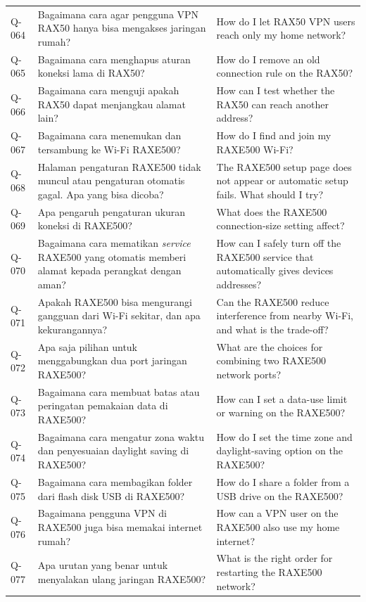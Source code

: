 \begin{longtable}{@{}>{\RaggedRight\arraybackslash}p{1.6cm}>{\RaggedRight\arraybackslash}p{5.8cm}>{\RaggedRight\arraybackslash}p{\dimexpr\textwidth-1.6cm-5.8cm-4\tabcolsep\relax}@{}}
Q-064 & Bagaimana cara agar pengguna VPN RAX50 hanya bisa mengakses jaringan rumah? & How do I let RAX50 VPN users reach only my home network? \\
Q-065 & Bagaimana cara menghapus aturan koneksi lama di RAX50? & How do I remove an old connection rule on the RAX50? \\
Q-066 & Bagaimana cara menguji apakah RAX50 dapat menjangkau alamat lain? & How can I test whether the RAX50 can reach another address? \\
Q-067 & Bagaimana cara menemukan dan tersambung ke Wi-Fi RAXE500? & How do I find and join my RAXE500 Wi-Fi? \\
Q-068 & Halaman pengaturan RAXE500 tidak muncul atau pengaturan otomatis gagal. Apa yang bisa dicoba? & The RAXE500 setup page does not appear or automatic setup fails. What should I try? \\
Q-069 & Apa pengaruh pengaturan ukuran koneksi di RAXE500? & What does the RAXE500 connection-size setting affect? \\
Q-070 & Bagaimana cara mematikan \emph{service} RAXE500 yang otomatis memberi alamat kepada perangkat dengan aman? & How can I safely turn off the RAXE500 service that automatically gives devices addresses? \\
Q-071 & Apakah RAXE500 bisa mengurangi gangguan dari Wi-Fi sekitar, dan apa kekurangannya? & Can the RAXE500 reduce interference from nearby Wi-Fi, and what is the trade-off? \\
Q-072 & Apa saja pilihan untuk menggabungkan dua port jaringan RAXE500? & What are the choices for combining two RAXE500 network ports? \\
Q-073 & Bagaimana cara membuat batas atau peringatan pemakaian data di RAXE500? & How can I set a data-use limit or warning on the RAXE500? \\
Q-074 & Bagaimana cara mengatur zona waktu dan penyesuaian daylight saving di RAXE500? & How do I set the time zone and daylight-saving option on the RAXE500? \\
Q-075 & Bagaimana cara membagikan folder dari flash disk USB di RAXE500? & How do I share a folder from a USB drive on the RAXE500? \\
Q-076 & Bagaimana pengguna VPN di RAXE500 juga bisa memakai internet rumah? & How can a VPN user on the RAXE500 also use my home internet? \\
Q-077 & Apa urutan yang benar untuk menyalakan ulang jaringan RAXE500? & What is the right order for restarting the RAXE500 network? \\

\end{longtable}
